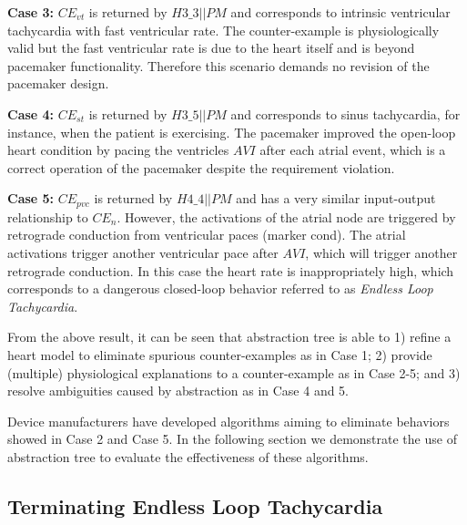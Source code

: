 \textbf{Case 3:} $CE_{vt}$ is returned by $H3\_3 || PM$ and corresponds to intrinsic ventricular tachycardia with fast ventricular rate.
The counter-example is physiologically valid but the fast ventricular rate is due to the heart itself and is beyond pacemaker functionality.
Therefore this scenario demands no revision of the pacemaker design.

\textbf{Case 4:}  $CE_{st}$ is returned by $H3\_5 || PM$ and corresponds to sinus tachycardia, for instance, when the patient is exercising.
The pacemaker improved the open-loop heart condition by pacing the ventricles $AVI$ after each atrial event, which is a correct operation of the pacemaker despite the requirement violation. 

\textbf{Case 5:} $CE_{pvc}$ is returned by $H4\_4 || PM$ and has a very similar input-output relationship to $CE_{n}$. 
However, the activations of the atrial node are triggered by retrograde conduction from ventricular paces (marker \textsf{cond}). 
The atrial activations trigger another ventricular pace after $AVI$, which will trigger another retrograde conduction. In this case the heart rate is inappropriately high, which corresponds to a dangerous closed-loop behavior referred to as \emph{Endless Loop Tachycardia}.

From the above result, it can be seen that abstraction tree is able to 1) refine a heart model to eliminate spurious counter-examples as in Case 1; 2) provide (multiple) physiological explanations to a counter-example as in Case 2-5; and 3) resolve ambiguities caused by abstraction as in Case 4 and 5.

Device manufacturers have developed algorithms aiming to eliminate behaviors showed in Case 2 and Case 5.
In the following section we demonstrate the use of abstraction tree to evaluate the effectiveness of these algorithms.

\subsection{Terminating Endless Loop Tachycardia}




